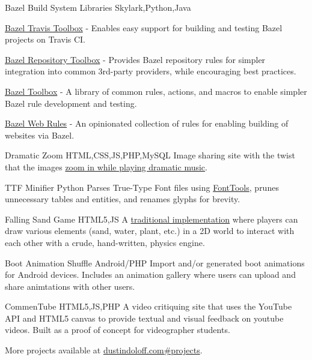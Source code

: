 \personalProject {} {Bazel Build System Libraries} {Skylark,Python,Java} {
    \begin {minimalItemize}
        \item \href {https://github.com/quittle/bazel_travis_toolbox} {Bazel Travis Toolbox} - Enables easy support for building and testing Bazel projects on Travis CI.
        \item \href {https://github.com/quittle/bazel_repository_toolbox} {Bazel Repository Toolbox} - Provides Bazel repository rules for simpler integration into common 3rd-party providers, while encouraging best practices.
        \item \href {https://github.com/quittle/bazel_toolbox} {Bazel Toolbox} - A library of common rules, actions, and macros to enable simpler Bazel rule development and testing.
        \item \href {https://github.com/quittle/rules_web} {Bazel Web Rules} - An opinionated collection of rules for enabling building of websites via Bazel.
    \end {minimalItemize}
}

 {Dramatic Zoom} {HTML,CSS,JS,PHP,MySQL} {
    Image sharing site with the twist that the images \href {https://youtu.be/a1Y73sPHKxw} {zoom in while playing dramatic music}.
}

\personalProject {} {TTF Minifier} {Python} {
    Parses True-Type Font files using \href {https://github.com/fonttools/fonttools} {FontTools}, prunes unnecessary tables and entities, and renames glyphs for brevity.
}

 {Falling Sand Game} {HTML5,JS} {
    A \href {https://en.wikipedia.org/wiki/Falling-sand_game} {traditional implementation} where players can draw various elements (sand, water, plant, etc.) in a 2D world to interact with each other with a crude, hand-written, physics engine.
}

 {Boot Animation Shuffle} {Android/PHP} {
    Import and/or generated boot animations for Android devices. Includes an animation gallery where users can upload and share animtations with other users.
}

 {CommenTube} {HTML5,JS,PHP} {
    A video critiquing site that uses the YouTube API and HTML5 canvas to provide textual and visual feedback on youtube videos. Built as a proof of concept for videographer students.
}

More projects available at \href {https://dustindoloff.com/\#projects} {dustindoloff.com\#projects}.
